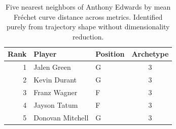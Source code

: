 \begin{table}[htbp]
  \centering\small
  \begin{tabular}{rllc}
    \toprule
    Rank & Player & Position & Archetype \\
    \midrule
    1 & Jalen Green & G & 3 \\
    2 & Kevin Durant & G & 3 \\
    3 & Franz Wagner & F & 3 \\
    4 & Jayson Tatum & F & 3 \\
    5 & Donovan Mitchell & G & 3 \\
    \bottomrule
  \end{tabular}
  \caption{Five nearest neighbors of Anthony Edwards by mean Fr\'{e}chet curve distance across metrics. Identified purely from trajectory shape without dimensionality reduction.}
  \label{tab:Anthony_Edwards_frechet_curve_neighbors}
\end{table}


